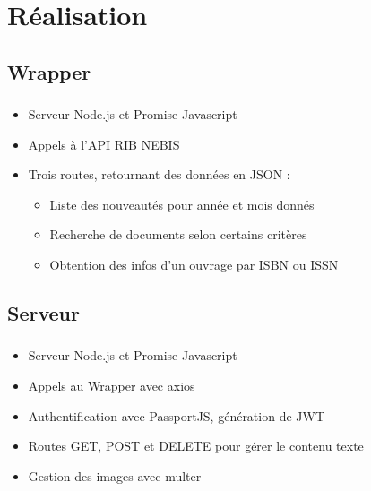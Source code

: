 \documentclass[10pt]{beamer}
\begin{document}
\section{Réalisation}
\subsection{Wrapper}
\begin{frame}
	\frametitle{\secname}
	\framesubtitle{\subsecname}
	\begin{itemize}
        \item Serveur Node.js et Promise Javascript
        \item Appels à l'API RIB NEBIS
        \item Trois routes, retournant des données en JSON :
        \begin{itemize}
            \item Liste des nouveautés pour année et mois donnés
            \item Recherche de documents selon certains critères
            \item Obtention des infos d'un ouvrage par ISBN ou ISSN
        \end{itemize}
    \end{itemize}
\end{frame}

\subsection{Serveur}
\begin{frame}
	\frametitle{\secname}
	\framesubtitle{\subsecname}
	\begin{itemize}
        \item Serveur Node.js et Promise Javascript
        \item Appels au Wrapper avec axios
        \item Authentification avec PassportJS, génération de JWT
        \item Routes GET, POST et DELETE pour gérer le contenu texte
        \item Gestion des images avec multer
    \end{itemize}
\end{frame}
\end{document}
